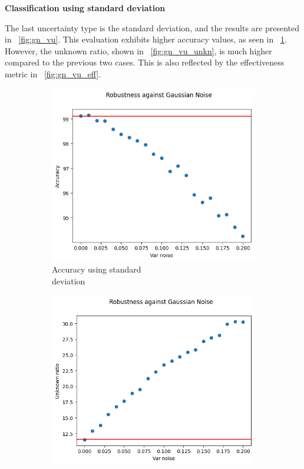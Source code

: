 \vspace{0.3cm}
\textbf{Classification using standard deviation}
\vspace{0.1cm}

The last uncertainty type is the standard deviation, and the results are presented in \Fig~\ref{fig:gn_vu}. This evaluation exhibits higher accuracy values, as seen in \Fig~\ref{fig:gn_vu_acc}. However, the unknown ratio, shown in \Fig~\ref{fig:gn_vu_unkn}, is much higher compared to the previous two cases. This is also reflected by the effectiveness metric in \Fig~\ref{fig:gn_vu_eff}.

\begin{figure}[h]
	\centering
	\begin{subfigure}{.33\textwidth}
		\centering
		\includegraphics[width=0.9\linewidth]{ImageFiles/EvalBNN/GN/VU/acc}
		\caption{Accuracy using standard \\ deviation}
		\label{fig:gn_vu_acc}
	\end{subfigure}%
	\begin{subfigure}{.33\textwidth}
		\centering
		\includegraphics[width=0.9\linewidth]{ImageFiles/EvalBNN/GN/VU/unkn}

\end{subfigure}
\end{figure}
